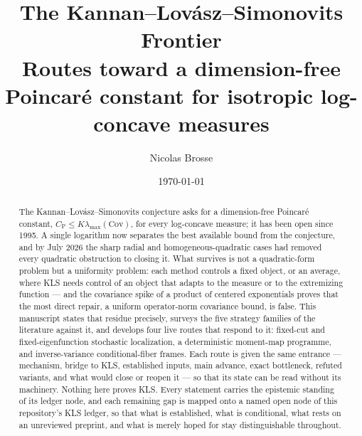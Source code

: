 \documentclass[11pt]{article}
\title{The Kannan--Lov\'asz--Simonovits Frontier\\[0.4em]
\large Routes toward a dimension-free Poincar\'e constant for isotropic
log-concave measures}
\author{Nicolas Brosse}
\date{\today}
\begin{document}
\maketitle

\begin{abstract}
  The Kannan--Lov\'asz--Simonovits conjecture asks for a dimension-free Poincar\'e constant,
  $C_{\mathrm P}\le K\lambda_{\max}(\mathrm{Cov})$, for every log-concave measure; it has been
  open since 1995. A single logarithm now separates the best available bound from the
  conjecture, and by July 2026 the sharp radial and homogeneous-quadratic cases had removed
  every quadratic obstruction to closing it. What survives is not a quadratic-form problem but
  a uniformity problem: each method controls a fixed object, or an average, where KLS needs
  control of an object that adapts to the measure or to the extremizing function --- and the
  covariance spike of a product of centered exponentials proves that the most direct repair,
  a uniform operator-norm covariance bound, is false. This manuscript states that residue
  precisely, surveys the five strategy families of the literature against it, and develops
  four live routes that respond to it: fixed-cut and fixed-eigenfunction stochastic
  localization, a deterministic moment-map programme, and inverse-variance conditional-fiber
  frames. Each route is given the same entrance --- mechanism, bridge to KLS, established
  inputs, main advance, exact bottleneck, refuted variants, and what would close or reopen it
  --- so that its state can be read without its machinery. Nothing here proves KLS. Every
  statement carries the epistemic standing of its ledger node, and each remaining gap is
  mapped onto a named open node of this repository's KLS ledger, so that what is established,
  what is conditional, what rests on an unreviewed preprint, and what is merely hoped for stay
  distinguishable throughout.
\end{abstract}

\setcounter{tocdepth}{1}
\tableofcontents
\end{document}
